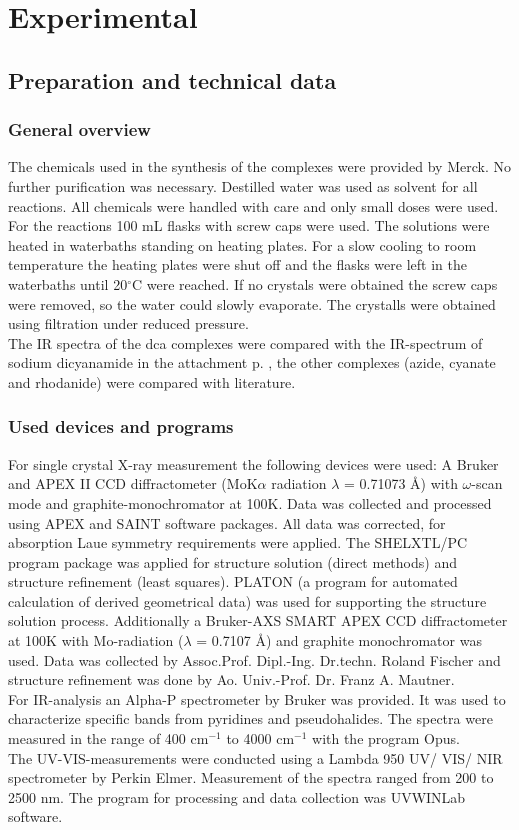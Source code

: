 \part{Experimental}
\chapter{Preparation and technical data}
\section{General overview}
The chemicals used in the synthesis of the complexes were provided by Merck. No further purification was necessary. Destilled water was used as solvent for all reactions. All chemicals were handled with care and only small doses were used. For the reactions 100 mL flasks with screw caps were used. The solutions were  heated in waterbaths standing on heating plates. For a  slow cooling to room temperature the heating plates were shut off and the flasks were left in the waterbaths until 20$^\circ$C were reached. If no crystals were obtained the screw caps were removed, so the water could slowly evaporate. The crystalls were obtained using filtration under reduced pressure.\\
The IR spectra of the dca complexes were compared with the IR-spectrum of sodium dicyanamide in the attachment p. \pageref{fig:dca-ir}, the other complexes (azide, cyanate and rhodanide) were compared with literature. \cite{kazuo} 
\section{Used devices and programs}
For single crystal X-ray measurement the following devices were used:
A Bruker and APEX II CCD diffractometer (MoK$\alpha$ radiation $\lambda$ = 0.71073 \AA) with $\omega$-scan mode and
graphite-monochromator at 100K. Data was collected and processed using APEX and SAINT \cite{apex} software packages. All data was corrected, for absorption  Laue symmetry requirements were applied. \cite{laue}
The SHELXTL/PC program package \cite{shelxtl} was applied for  structure solution (direct methods) and structure refinement (least squares). PLATON \cite{platon} (a program for automated
calculation of derived geometrical data) was used for supporting the structure solution process.
Additionally a Bruker-AXS SMART APEX CCD diffractometer at 100K with Mo-radiation ($\lambda$ = 0.7107 \AA) and
graphite monochromator was used.
Data was collected by Assoc.Prof. Dipl.-Ing. Dr.techn. Roland Fischer and structure refinement was done by Ao. Univ.-Prof. Dr. Franz A. Mautner.
\\For IR-analysis an Alpha-P spectrometer by Bruker was provided. It was used to characterize specific bands from pyridines and pseudohalides. The spectra were measured in the range of  400 cm$^{-1}$ to 4000 cm$^{-1}$ with the program Opus. \cite{opus}
\\The UV-VIS-measurements were conducted using a Lambda 950 UV/ VIS/ NIR spectrometer by Perkin Elmer. Measurement of the spectra ranged from 200 to 2500 nm. The program for processing and data collection was UVWINLab software. \cite{uvwin}